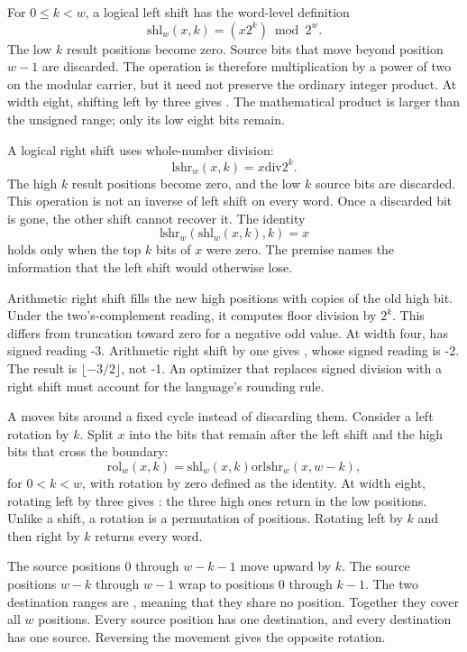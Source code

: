 For \(0\leq k<w\), a logical left shift has the word-level definition
\[
  \mathrm{shl}_w(x,k)=(x2^k)\bmod 2^w.
\]
The low \(k\) result positions become zero. Source bits that move beyond
position \(w-1\) are discarded. The operation is therefore multiplication by
a power of two on the modular carrier, but it need not preserve the ordinary
integer product. At width eight, shifting  left by three gives
. The mathematical product is larger than the unsigned range;
only its low eight bits remain.

A logical right shift uses whole-number division:
\[
  \mathrm{lshr}_w(x,k)=x\mathbin{\mathrm{div}}2^k.
\]
The high \(k\) result positions become zero, and the low \(k\) source bits are
discarded. This operation is not an inverse of left shift on every word. Once
a discarded bit is gone, the other shift cannot recover it. The identity
\[
  \mathrm{lshr}_w(\mathrm{shl}_w(x,k),k)=x
\]
holds only when the top \(k\) bits of \(x\) were zero. The premise names the
information that the left shift would otherwise lose.

Arithmetic right shift fills the new high positions with copies of the old
high bit. Under the two's-complement reading, it computes floor division by
\(2^k\). This differs from truncation toward zero for a negative odd value.
At width four,  has signed reading -3. Arithmetic right shift by
one gives , whose signed reading is -2. The result is
\(\lfloor-3/2\rfloor\), not -1. An optimizer that replaces signed division
with a right shift must account for the language's rounding rule.

A  moves bits around a fixed cycle instead of discarding
them. Consider a left rotation by \(k\). Split \(x\) into the bits that remain
after the left shift and the high bits that cross the boundary:
\[
  \mathrm{rol}_w(x,k)=
  \mathrm{shl}_w(x,k)\mathbin{\mathrm{or}}
  \mathrm{lshr}_w(x,w-k),
\]
for \(0<k<w\), with rotation by zero defined as the identity. At width eight,
rotating  left by three gives : the three high
ones return in the low positions. Unlike a shift, a rotation is a permutation
of positions. Rotating left by \(k\) and then right by \(k\) returns every
word.

\begin{proofkit}[title={\iconProofKit\ Why a rotation loses no bit}]
The source positions \(0\) through \(w-k-1\) move upward by \(k\). The source
positions \(w-k\) through \(w-1\) wrap to positions \(0\) through \(k-1\).
The two destination ranges are , meaning that they share no
position. Together they cover all \(w\) positions. Every source position has one destination, and every destination
has one source. Reversing the movement gives the opposite rotation.
\end{proofkit}


